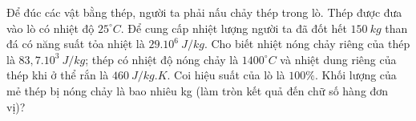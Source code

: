 \begin{ex} 
	Để đúc các vật bằng thép, người ta phải nấu chảy thép trong lò. Thép được đưa vào lò có nhiệt độ $25^\circ C$. Để cung cấp nhiệt lượng người ta đã đốt hết $150 \ kg$ than đá có năng suất tỏa nhiệt là $29.10^{6} \ J/kg$. Cho biết nhiệt nóng chảy riêng của thép là $83,7.10^3 \ J/kg$; thép có nhiệt độ nóng chảy là $1400^\circ C$ và nhiệt dung riêng của thép khi ở thể rắn là $460 \ J/kg. K$. Coi hiệu suất của lò là $100 \%$. Khối lượng của mẻ thép bị nóng chảy là bao nhiêu kg (làm tròn kết quả đến chữ số hàng đơn vị)?
\end{ex}

